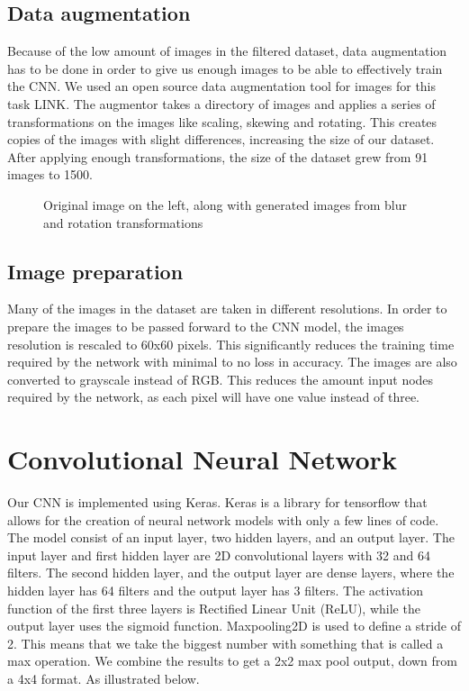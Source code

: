 \subsection{Data augmentation}\label{data augmentation}
Because of the low amount of images in the filtered dataset, data augmentation has to be done in order to give us enough images to be able to effectively train the CNN.
We used an open source data augmentation tool for images for this task LINK.
The augmentor takes a directory of images and applies a series of transformations on the images like scaling, skewing and rotating.
This creates copies of the images with slight differences, increasing the size of our dataset.
After applying enough transformations, the size of the dataset grew from 91 images to 1500.

\begin{figure}[h]
    \caption{Original image on the left, along with generated images from blur and rotation transformations}
    \label{fig:figure4.2}
\end{figure}

\subsection{Image preparation}\label{imgprep}
Many of the images in the dataset are taken in different resolutions.
In order to prepare the images to be passed forward to the CNN model, the images resolution is rescaled to 60x60 pixels.
This significantly reduces the training time required by the network with minimal to no loss in accuracy.
The images are also converted to grayscale instead of RGB.
This reduces the amount input nodes required by the network, as each pixel will have one value instead of three.

\section{Convolutional Neural Network}\label{sec:cnn}

Our CNN is implemented using Keras.
Keras is a library for tensorflow that allows for the creation of neural network models with only a few lines of code.
The model consist of an input layer, two hidden layers, and an output layer.
The input layer and first hidden layer are 2D convolutional layers with 32 and 64 filters.
The second hidden layer, and the output layer are dense layers, where the hidden layer has 64 filters and the output layer has 3 filters.
The activation function of the first three layers is Rectified Linear Unit (ReLU), while the output layer uses the sigmoid function.
Maxpooling2D is used to define a stride of 2.
This means that we take the biggest number with something that is called a max operation.
We combine the results to get a 2x2 max pool output, down from a 4x4 format.
As illustrated below.


